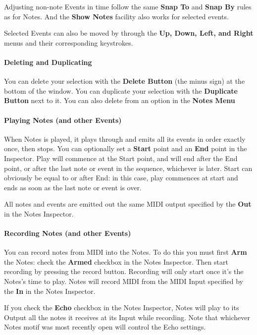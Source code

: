 \documentclass[twoside,10pt]{article}
\begin{document}
Adjusting non-note Events in time follow the same {\bf Snap To} and {\bf Snap By} rules as for Notes.  And the {\bf Show Notes} facility also works for selected events.

Selected Events can also be moved by through the {\bf Up, Down, Left, and Right} menus and their corresponding keystrokes. 

\paragraph{Deleting and Duplicating}

You can delete your selection with the {\bf Delete Button} (the minus sign) at the bottom of the window.  You can duplicate your selection with the {\bf Duplicate Button} next to it.  You can also delete from an option in the {\bf Notes Menu}  

\paragraph{Playing Notes (and other Events)}

When Notes is played, it plays through and emits all its events in order exactly once, then stops.  You can optionally set a {\bf Start} point and an {\bf End} point in the Inspector.  Play will commence at the Start point, and will end after the End point, or after the last note or event in the sequence, whichever is later.  Start can obviously be equal to or after End: in this case, play commences at start and ends as soon as the last note or event is over.

All notes and events are emitted out the same MIDI output specified by the {\bf Out} in the Notes Inspector.

\paragraph{Recording Notes (and other Events)}

You can record notes from MIDI into the Notes.  To do this you must first {\bf Arm} the Notes: check the {\bf Armed} checkbox in the Notes Inspector.  Then start recording by pressing the record button.  Recording will only start once it's the Notes's time to play.  Notes will record MIDI from the MIDI Input specified by the {\bf In} in the Notes Inspector.

If you check the {\bf Echo} checkbox in the Notes Inspector, Notes will play to its Output all the notes it receives at its Input while recording.  Note that whichever Notes motif was most recently open will control the Echo settings.
\end{document}

